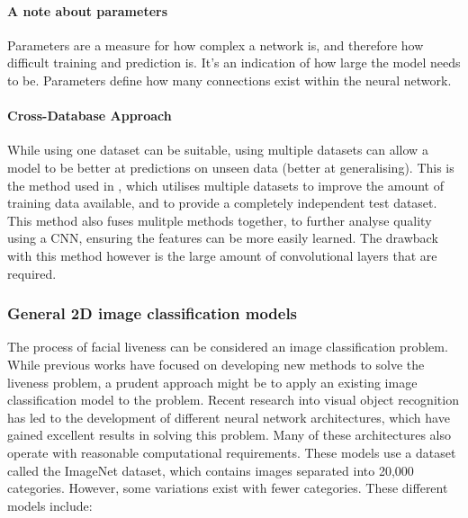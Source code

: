 \documentclass[12pt,a4paper]{article}
\begin{document}
        \paragraph{A note about parameters}
        Parameters are a measure for how complex a network is, and therefore how difficult training and prediction is. It's an indication of how large the model needs to be. Parameters define how many connections exist within the neural network.

        \paragraph{Cross-Database Approach}
        While using one dataset can be suitable, using multiple datasets can allow a model to be better at predictions on unseen data (better at generalising). This is the method used in \cite{Patel2016CrossDatabaseFA}, which utilises multiple datasets to improve the amount of training data available, and to provide a completely independent test dataset.
        This method also fuses mulitple methods together, to further analyse quality using a CNN, ensuring the features can be
        more easily learned. The drawback with this method however is the large amount of convolutional layers that are required. 
        
        \subsubsection{General 2D image classification models}
        The process of facial liveness can be considered an image classification problem. 
        While previous works have focused on developing new methods to solve the liveness problem, a prudent approach might be to apply an existing image classification model to the problem. 
        Recent research into visual object recognition has led to the development of different neural network architectures, which have gained excellent results in solving this problem.
        Many of these architectures also operate with reasonable computational requirements.
        These models use a dataset called the ImageNet dataset, which contains images separated into 20,000 categories. However, some variations exist with fewer categories.
        These different models include:
            
\end{document}
